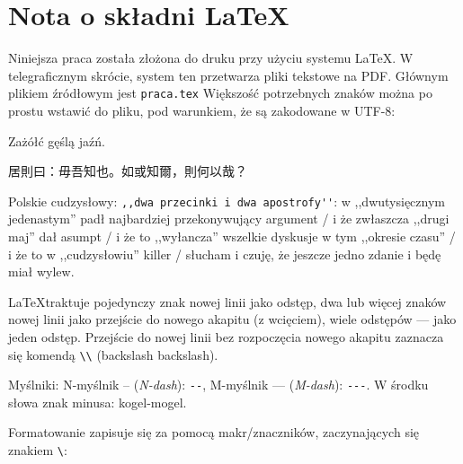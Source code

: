 \section*{Nota o składni \LaTeX}
Niniejsza praca została złożona do druku przy użyciu systemu \LaTeX. W telegraficznym skrócie, system ten przetwarza pliki tekstowe na PDF. Głównym plikiem źródłowym jest \verb_praca.tex_ Większość potrzebnych znaków można po prostu wstawić do pliku, pod warunkiem, że są zakodowane w UTF-8:

Zażółć gęślą jaźń.

居則曰：毋吾知也。如或知爾，則何以哉？

Polskie cudzysłowy: \verb_,,dwa przecinki i dwa apostrofy''_: w ,,dwutysięcznym jedenastym'' padł najbardziej przekonywujący argument / i że zwłaszcza ,,drugi maj'' dał asumpt / i że to ,,wyłancza'' wszelkie dyskusje w tym ,,okresie czasu'' / i że to w ,,cudzysłowiu'' killer / słucham i czuję, że jeszcze jedno zdanie i będę miał wylew.

\LaTeX traktuje pojedynczy znak nowej linii jako odstęp, dwa lub więcej znaków nowej linii jako przejście do nowego akapitu (z wcięciem), wiele odstępów --- jako jeden odstęp. Przejście do nowej linii bez rozpoczęcia nowego akapitu zaznacza się komendą \verb_\\_ (backslash backslash).

Myślniki: N-myślnik -- (\textit{N-dash}): \verb_--_, M-myślnik --- (\textit{M-dash}): \verb_---_. W środku słowa znak minusa: kogel-mogel.

Formatowanie zapisuje się za pomocą makr/znaczników, zaczynających się znakiem \verb_\_:

